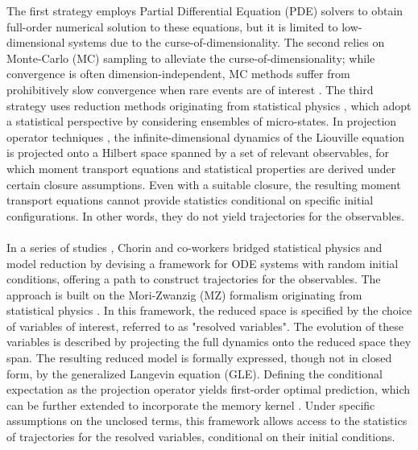 \documentclass[11pt, a4paper, oneside, reqno]{amsart}
\begin{document}
The first strategy employs Partial Differential Equation (PDE) solvers to obtain full-order numerical solution to these equations, but it is limited to low-dimensional systems due to the curse-of-dimensionality. 
The second relies on Monte-Carlo (MC) sampling \cite{kloeden2011stochastic,rogers1996diffusions} to alleviate the curse-of-dimensionality; while convergence is often dimension-independent, MC methods suffer from prohibitively slow convergence when rare events are of interest \cite{budhiraja2019analysis}. The third strategy uses reduction methods originating from statistical physics \cite{gallavotti2013statistical,ellis2012entropy}, which adopt a statistical perspective by considering ensembles of micro-states. In projection operator techniques \cite{grabert1982proj,_ttinger_2005,Vrugt_2020}, the infinite-dimensional dynamics of the Liouville equation is projected onto a Hilbert space spanned by a set of relevant observables, for which moment transport equations and statistical properties are derived under certain closure assumptions. Even with a suitable closure, the resulting moment transport equations cannot provide statistics conditional on specific initial configurations. In other words, they do not yield trajectories for the observables.  \\ \ \\
In a series of studies \cite{chorin2000MZ,CHORIN2009optimal_prediction_memory}, Chorin and co-workers  bridged statistical physics and model reduction by devising a framework for ODE systems with random initial conditions, offering a path to construct trajectories for the observables. The approach is built on the Mori-Zwanzig (MZ) formalism \cite{Evans_Morriss_2008,gouasmi2017memory,Givon2005orthogdyn} originating from statistical physics \cite{Evans_Morriss_2008}.   
In this framework, the reduced space is specified by the choice of variables of interest, referred to as "resolved variables". The evolution of these variables is described by projecting the full dynamics onto the reduced space they span. The resulting reduced model is formally expressed, though not in closed form, by the generalized Langevin equation (GLE). 
Defining the conditional expectation as the projection operator yields first-order optimal prediction, which can be further extended to incorporate the memory kernel \cite{chorin2000MZ,CHORIN2009optimal_prediction_memory}.  
Under specific assumptions on the unclosed terms, this framework allows access to the statistics of trajectories for the resolved variables, conditional on their initial conditions.
\end{document}
